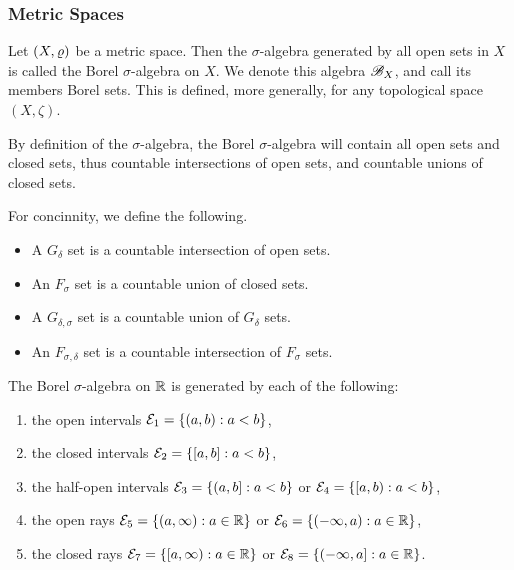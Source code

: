 \documentclass[12pt]{article} %
\begin{document}

\subsubsection{Metric Spaces}

\begin{definition}
    Let $(X, \varrho)$ be a metric space. Then the $\sigma$-algebra generated by all open sets in $X$ is called the Borel $\sigma$-algebra on $X$. We denote this algebra $\mathscr{B}_X$, and call its members Borel sets. This is defined, more generally, for any topological space $(X, \zeta)$.
\end{definition}

\begin{remark}
    By definition of the $\sigma$-algebra, the Borel $\sigma$-algebra will contain all open sets and closed sets, thus countable intersections of open sets, and countable unions of closed sets.
\end{remark}

\begin{definition}
    For concinnity, we define the following.
    \begin{itemize}
        \item A $G_\delta$ set is a countable intersection of open sets.
        \item An $F_\sigma$ set is a countable union of closed sets.
        \item A $G_{\delta, \sigma}$ set is a countable union of $G_\delta$ sets.
        \item An $F_{\sigma, \delta}$ set is a countable intersection of $F_\sigma$ sets.
    \end{itemize}
\end{definition}

\begin{proposition}
    The Borel $\sigma$-algebra on $\mathbb{R}$ is generated by each of the following:\begin{enumerate}
        \item the open intervals $\mathcal{E}_1 = \{(a, b) : a < b\}$,
        \item the closed intervals $\mathcal{E}_2 = \{[a, b] : a < b\}$,
        \item the half-open intervals $\mathcal{E}_3 = \{(a, b] : a < b\}$ or $\mathcal{E}_4 = \{[a, b) : a < b\}$,
        \item the open rays $\mathcal{E}_5 = \{(a, \infty) : a \in \mathbb{R} \}$ or $\mathcal{E}_6 = \{(-\infty, a) : a \in \mathbb{R} \}$,
        \item the closed rays $\mathcal{E}_7 = \{[a, \infty) : a \in \mathbb{R}\}$ or $\mathcal{E}_8 = \{(-\infty, a] : a \in \mathbb{R}\}$.
    \end{enumerate}
\end{proposition}
\end{document}
